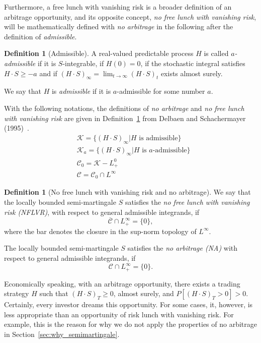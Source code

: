 \documentclass[a4paper]{article}
\theoremstyle{definition}
\newtheorem{definition}[theorem]{Definition}
\numberwithin{equation}{section}
\begin{document}
Furthermore, a free lunch with vanishing risk is a broader definition of an arbitrage opportunity, and its opposite concept, \emph{no free lunch with vanishing risk}, will be mathematically defined with
\emph{no arbitrage} in the following after the definition of \emph{admissible}.
\begin{definition}[Admissible]
A real-valued predictable process $H$ is called \emph{$a$-admissible} if it is $S$-integrable, if $H(0)=0$, if the stochastic integral satisfies $H\cdot S\geq-a$ and if $(H\cdot S)_\infty=\lim_{t\rightarrow\infty}(H\cdot S)_t$ exists almost surely.

We say that $H$ is \emph{admissible} if it is $a$-admissible for some number $a$.
\end{definition}
With the following notations, the definitions of \emph{no arbitrage} and \emph{no free lunch with vanishing risk} are given in Definition~\ref{def:NA&NFLVR} from Delbaen and Schachermayer (1995)~\cite{NFLVR}.
\begin{equation}\nonumber
\begin{aligned}
&\mathcal K=\{(H\cdot S)_\infty|H\text{ is admissible}\}\\
&\mathcal K_a=\{(H\cdot S)_\infty|H\text{ is $a$-admissible}\}\\
&\mathcal C_0=\mathcal K-L^0_+\\
&\mathcal C=\mathcal C_0\cap L^\infty
\end{aligned}
\end{equation}
\begin{definition}[No free lunch with vanishing risk and no arbitrage]\label{def:NA&NFLVR}
We say that the locally bounded semi-martingale $S$ satisfies the \emph{no free lunch with vanishing risk (NFLVR)}, with respect to general admissible integrands, if
$$\overline{\mathcal C}\cap L^\infty_+=\{0\},$$
where the bar denotes the closure in the sup-norm topology of $L^\infty$.

The locally bounded semi-martingale $S$ satisfies the \emph{no arbitrage (NA)} with respect to general admissible integrands, if
$$\mathcal C\cap L^\infty_+=\{0\}.$$
\end{definition}
Economically speaking, with an arbitrage opportunity, there exists a trading strategy $H$ such that $(H\cdot S)_T\geq0$, almost surely, and $P[(H\cdot S)_T>0]>0$. Certainly, every investor dreams this opportunity. For some cases, it, however, is less appropriate than an opportunity of risk lunch with vanishing risk. For example, this is the reason for why we do not apply the properties of no arbitrage in Section~\ref{sec:why_semimartingale}.%
\end{document}
